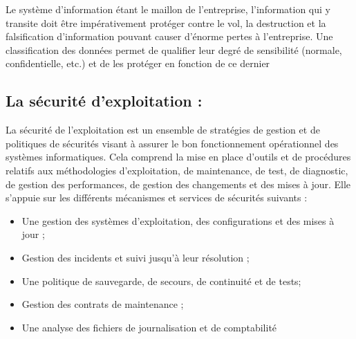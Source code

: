 Le système d’information étant le maillon de l’entreprise, l’information qui y transite doit être impérativement protéger contre le vol, la destruction et la falsification d’information pouvant causer d'énorme pertes à l’entreprise. Une classification des données permet de qualifier leur degré de sensibilité (normale, confidentielle, etc.) et de les protéger en fonction de ce dernier
\subsection{La sécurité d'exploitation : }
La sécurité de l'exploitation est un ensemble de stratégies de gestion et de politiques de sécurités visant à assurer le bon fonctionnement opérationnel des systèmes informatiques. Cela comprend la mise en place d'outils et de procédures relatifs aux méthodologies d'exploitation, de maintenance, de test, de diagnostic, de gestion des performances, de gestion des changements et des mises à jour\cite{ref4}. Elle s'appuie sur les différents mécanismes et services de sécurités suivants :
\begin{itemize}[label=\textbullet]
\item Une gestion des systèmes d’exploitation, des configurations et des mises à jour ;
\item Gestion des incidents et suivi jusqu’à leur résolution ;
\item Une politique de sauvegarde, de secours, de continuité et de tests;
\item Gestion des contrats de maintenance ;
\item Une analyse des fichiers de journalisation et de comptabilité 
\end{itemize}
